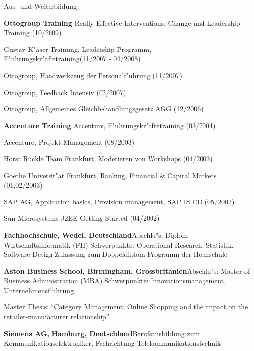 \begin{rubric}{Aus- und Weiterbildung}

\entry*[01/2005--10/2009] \textbf{Ottogroup Training}\newline
Really Effective Interventions, Change und Leadership Training (10/2009)

Gustav K"aser Trainung, Leadership Programm, F"uhrungskr"aftetraining(11/2007 - 04/2008)

Ottogroup, Handwerkzeug der Personalf"uhrung (11/2007)

Ottogroup, Feedback Intensiv (02/2007)

Ottogroup, Allgemeines Gleichbehandlungsgesetz AGG (12/2006)



\entry*[04/2002--12/2004] \textbf{Accenture Training}\newline
Accenture, F"uhrungskr"aftetraining (03/2004)

Accenture, Projekt Management (08/2003)

Horst R\"u{}ckle Team Frankfurt, Moderieren von Workshops (04/2003)

Goethe Universit"at Frankfurt, Banking, Financial \& Capital Markets (01,02/2003)

SAP AG, Application basics, Provision management, SAP IS CD (05/2002)

Sun Microsystems J2EE Getting Started (04/2002)

\entry*[04/1997--09/2001] \textbf{Fachhochschule, Wedel, Deutschland}\newline Abschlu"s: Diplom-Wirtschaftsinformatik (FH) \newline Schwerpunkte: Operational Research, Statistik, Software Design \newline Zulassung zum Doppeldiplom-Programm der Hochschule

\entry*[10/1999--10/2000] \textbf{Aston Business School, Birmingham, Grossbritanien}\newline Abschlu"s: Master of Business Administration (MBA) \newline Schwerpunkte: 
Innovationsmanagement, Unternehmensf"uhrung

Master Thesis: ``Category Management: Online Shopping and the impact on the retailer-manufacturer relationship''


\entry*[08/1991--02/1995] \textbf{Siemens AG, Hamburg, Deutschland}\newline Berufsausbildung zum Kommunikationselektroniker, Fachrichtung Telekommunikationstechnik

\end{rubric}
